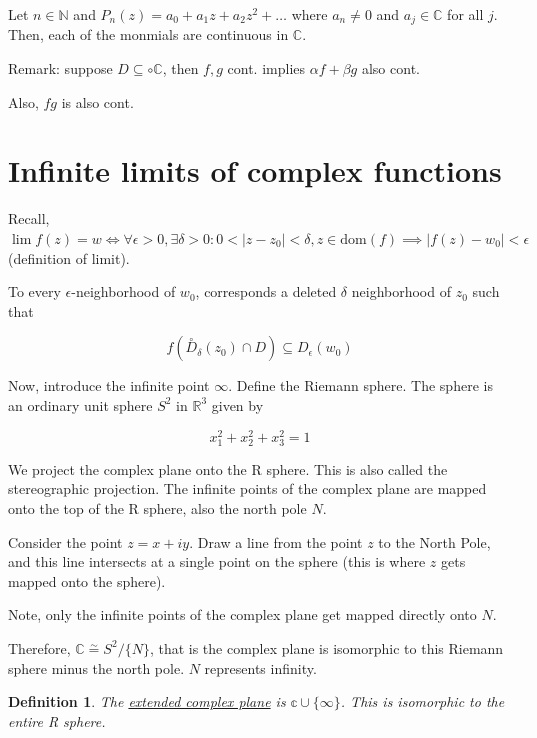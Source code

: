 \documentclass{article}
\newtheorem{definition}[theorem]{Definition}
\newtheorem{one minute paper}[theorem]{One Minute Paper}
\begin{document}
Let $n \in \mathbb{N}$ and $P_n(z) = a_0 + a_1z + a_2z^2 + \dots$ where $a_n \neq 0$ and $a_j \in \mathbb{C}$ for all $j$.
Then, each of the monmials are continuous in $\mathbb{C}$. 

Remark: suppose $D \subseteq \circ\mathbb{C}$, then $f,g$ cont. implies $\alpha f + \beta g$ also cont. 

Also, $fg$ is also cont. 

\section*{Infinite limits of complex functions}

Recall, $\lim f(z) = w \iff \forall \epsilon >0, \exists \delta >0: 0 < |z - z_0| < \delta, z \in \text{dom}(f) \implies |f(z) - w_0| < \epsilon$ (definition of limit). 

To every $\epsilon$-neighborhood of $w_0$, corresponds a deleted $\delta$ neighborhood of $z_0$ such that 

\begin{equation}
    f(\overset{\circ}{D}_{\delta}(z_0) \cap D) \subseteq D_{\epsilon}(w_0)
\end{equation}

Now, introduce the infinite point $\infty$. Define the Riemann sphere. The sphere is an ordinary unit sphere $S^2$ in $\mathbb{R}^3$ given by 

\begin{equation}
    x_1^2 + x_2^2 + x_3^2 = 1
\end{equation}

We project the complex plane onto the R sphere. This is also called the stereographic projection. The infinite points of the complex plane are mapped onto the top of the R sphere, also the north pole $N$. 

Consider the point $z = x + iy$. Draw a line from the point $z$ to the North Pole, and this line intersects at a single point on the sphere (this is where $z$ gets mapped onto the sphere). 

Note, only the infinite points of the complex plane get mapped directly onto $N$. 

Therefore, $\mathbb{C} \overset{\sim}{=} S^2/\{N\}$, that is the complex plane is isomorphic to this Riemann sphere minus the north pole. $N$ represents infinity. 

\begin{definition}
    The \underline{extended complex plane} is $\mathbb{c} \cup \{\infty\}$. This is isomorphic to the entire R sphere. 
\end{definition}
\end{document}
